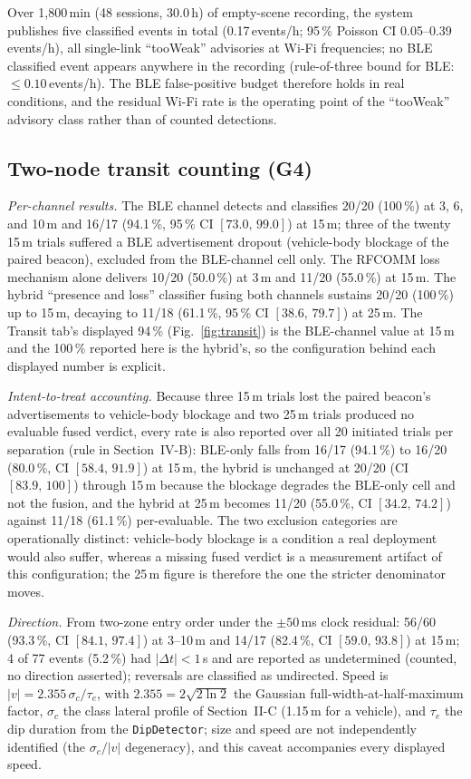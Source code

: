 \documentclass[journal,10pt]{IEEEtran}
\begin{document}
Over 1{,}800\,min (48 sessions, 30.0\,h) of empty-scene recording, the system
publishes five classified events in total (0.17\,events/h; 95\,\% Poisson CI
0.05--0.39\,events/h), all single-link ``tooWeak'' advisories at Wi-Fi
frequencies; no BLE classified event appears anywhere in the recording
(rule-of-three bound for BLE: $\leq0.10$\,events/h). The BLE false-positive
budget therefore holds in real conditions, and the residual Wi-Fi rate is the
operating point of the ``tooWeak'' advisory class rather than of counted
detections.

\subsection{Two-node transit counting (G4)}
\label{sec:transitres}
\emph{Per-channel results.} The BLE channel detects and classifies 20/20
(100\,\%) at 3, 6, and 10\,m and 16/17 (94.1\,\%, 95\,\% CI
$[73.0,\,99.0]$) at 15\,m; three of the twenty 15\,m trials suffered a BLE
advertisement dropout (vehicle-body blockage of the paired beacon), excluded
from the BLE-channel cell only. The RFCOMM loss mechanism alone delivers 10/20
(50.0\,\%) at 3\,m and 11/20 (55.0\,\%) at 15\,m. The hybrid ``presence and
loss'' classifier fusing both channels sustains 20/20 (100\,\%) up to 15\,m,
decaying to 11/18 (61.1\,\%, 95\,\% CI $[38.6,\,79.7]$) at 25\,m. The Transit
tab's displayed 94\,\% (Fig.~\ref{fig:transit}) is the BLE-channel value at
15\,m and the 100\,\% reported here is the hybrid's, so the configuration
behind each displayed number is explicit.

\emph{Intent-to-treat accounting.} Because three 15\,m trials lost the paired
beacon's advertisements to vehicle-body blockage and two 25\,m trials produced
no evaluable fused verdict, every rate is also reported over all 20 initiated
trials per separation (rule in Section~IV-B): BLE-only falls from 16/17
(94.1\,\%) to 16/20 (80.0\,\%, CI $[58.4,\,91.9]$) at 15\,m, the hybrid is
unchanged at 20/20 (CI $[83.9,\,100]$) through 15\,m because the blockage
degrades the BLE-only cell and not the fusion, and the hybrid at 25\,m becomes
11/20 (55.0\,\%, CI $[34.2,\,74.2]$) against 11/18 (61.1\,\%) per-evaluable.
The two exclusion categories are operationally distinct: vehicle-body blockage
is a condition a real deployment would also suffer, whereas a missing fused
verdict is a measurement artifact of this configuration; the 25\,m figure is
therefore the one the stricter denominator moves.

\emph{Direction.} From two-zone entry order under the $\pm50$\,ms clock
residual: 56/60 (93.3\,\%, CI $[84.1,\,97.4]$) at 3--10\,m and 14/17 (82.4\,\%,
CI $[59.0,\,93.8]$) at 15\,m; 4 of 77 events (5.2\,\%) had $|\Delta t| < 1$\,s
and are reported as undetermined (counted, no direction asserted);
reversals are classified as undirected. Speed is $|v| = 2.355\,\sigma_c/\tau_e$,
with $2.355 = 2\sqrt{2\ln 2}$ the Gaussian full-width-at-half-maximum factor,
$\sigma_c$ the class lateral profile of Section~II-C (1.15\,m for a vehicle),
and $\tau_e$ the dip duration from the \texttt{DipDetector}; size and speed are
not independently identified (the $\sigma_c/|v|$ degeneracy), and this caveat
accompanies every displayed speed.
\end{document}
